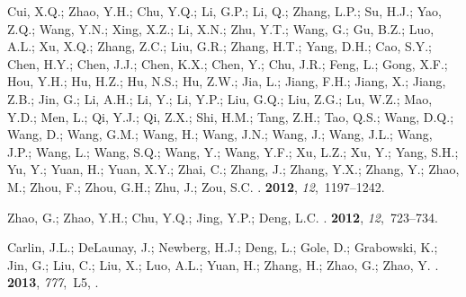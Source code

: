 \begin{thebibliography}{-------}
{Cui}, X.Q.; {Zhao}, Y.H.; {Chu}, Y.Q.; {Li}, G.P.; {Li}, Q.; {Zhang}, L.P.;
  {Su}, H.J.; {Yao}, Z.Q.; {Wang}, Y.N.; {Xing}, X.Z.; {Li}, X.N.; {Zhu}, Y.T.;
  {Wang}, G.; {Gu}, B.Z.; {Luo}, A.L.; {Xu}, X.Q.; {Zhang}, Z.C.; {Liu}, G.R.;
  {Zhang}, H.T.; {Yang}, D.H.; {Cao}, S.Y.; {Chen}, H.Y.; {Chen}, J.J.; {Chen},
  K.X.; {Chen}, Y.; {Chu}, J.R.; {Feng}, L.; {Gong}, X.F.; {Hou}, Y.H.; {Hu},
  H.Z.; {Hu}, N.S.; {Hu}, Z.W.; {Jia}, L.; {Jiang}, F.H.; {Jiang}, X.; {Jiang},
  Z.B.; {Jin}, G.; {Li}, A.H.; {Li}, Y.; {Li}, Y.P.; {Liu}, G.Q.; {Liu}, Z.G.;
  {Lu}, W.Z.; {Mao}, Y.D.; {Men}, L.; {Qi}, Y.J.; {Qi}, Z.X.; {Shi}, H.M.;
  {Tang}, Z.H.; {Tao}, Q.S.; {Wang}, D.Q.; {Wang}, D.; {Wang}, G.M.; {Wang},
  H.; {Wang}, J.N.; {Wang}, J.; {Wang}, J.L.; {Wang}, J.P.; {Wang}, L.; {Wang},
  S.Q.; {Wang}, Y.; {Wang}, Y.F.; {Xu}, L.Z.; {Xu}, Y.; {Yang}, S.H.; {Yu}, Y.;
  {Yuan}, H.; {Yuan}, X.Y.; {Zhai}, C.; {Zhang}, J.; {Zhang}, Y.X.; {Zhang},
  Y.; {Zhao}, M.; {Zhou}, F.; {Zhou}, G.H.; {Zhu}, J.; {Zou}, S.C.
.
 {\bf 2012}, {\em
  12},~1197--1242.

{Zhao}, G.; {Zhao}, Y.H.; {Chu}, Y.Q.; {Jing}, Y.P.; {Deng}, L.C.
.
 {\bf 2012}, {\em
  12},~723--734.

{Carlin}, J.L.; {DeLaunay}, J.; {Newberg}, H.J.; {Deng}, L.; {Gole}, D.;
  {Grabowski}, K.; {Jin}, G.; {Liu}, C.; {Liu}, X.; {Luo}, A.L.; {Yuan}, H.;
  {Zhang}, H.; {Zhao}, G.; {Zhao}, Y.
.
 {\bf 2013}, {\em 777},~L5,
  \href{http://xxx.lanl.gov/abs/1309.6314}{{\normalfont [1309.6314]}}.


\end{thebibliography}
